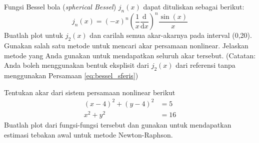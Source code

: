 \begin{soal}
Fungsi Bessel bola (\textit{spherical Bessel}) $j_{n}(x)$ dapat dituliskan sebagai
berikut:
\begin{equation}
j_{n}(x) = (-x)^{n}
\left( \frac{1}{x} \frac{\mathrm{d}}{\mathrm{d}x} \right)^n
\frac{\sin(x)}{x}
\label{eq:bessel_sferis}
\end{equation}
Buatlah plot untuk $j_{2}(x)$ dan carilah semua akar-akarnya pada interval (0,20).
Gunakan salah satu metode untuk mencari akar persamaan nonlinear. Jelaskan metode
yang Anda gunakan untuk mendapatkan seluruh akar tersebut.
(Catatan: Anda boleh menggunakan bentuk eksplisit dari $j_2(x)$ dari referensi
tanpa menggunakan Persamaan \ref{eq:bessel_sferis})
\end{soal}


\begin{soal}
Tentukan akar dari sistem persamaan nonlinear berikut
\begin{align*}
(x - 4)^2 + (y - 4)^2 & = 5 \\
x^2 + y^2 & = 16
\end{align*}
Buatlah plot dari fungsi-fungsi tersebut dan gunakan untuk mendapatkan estimasi tebakan
awal untuk metode Newton-Raphson.
\end{soal}







